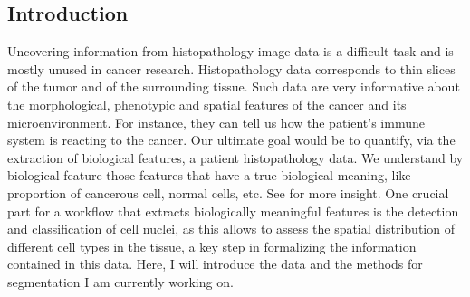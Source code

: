 \documentclass[a0,portrait]{a0poster}
\begin{document}
\vspace{1cm} %


\begin{multicols}{2} %


\color{Navy} %

\section*{Introduction}

Uncovering information from histopathology image data is a difficult
task and is mostly unused in cancer research. Histopathology data
corresponds to thin slices of the tumor and of the surrounding
tissue. Such data are very informative about the morphological, phenotypic and
spatial features of the cancer and its microenvironment. For instance,
they can tell us how the patient's immune system is reacting
to the cancer. Our ultimate goal would be to quantify, via the
extraction of biological features, a patient histopathology
data. We understand by biological feature those features that have a true biological
meaning, like proportion of cancerous cell, normal cells, etc. See
\cite{yuan2012quantitative} for more insight. One crucial part for a
workflow that extracts biologically meaningful features is the
detection and classification of
cell nuclei, as this allows to assess the spatial distribution of
different cell types in the tissue, a key step in formalizing the
information contained in this data. Here, I will introduce the
data and the methods for segmentation I am currently working on. 






\end{multicols}
\end{document}
